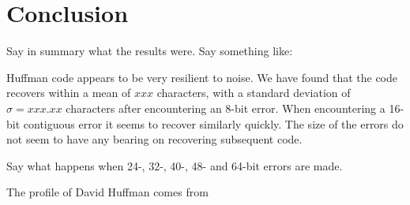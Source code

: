 \documentclass[a4wide,11pt]{article}
\begin{document}
\section{Conclusion}
\label{section:conclusion}
Say in summary what the results were. Say something like:  

Huffman code appears to be very resilient to noise.  We have found that the
code recovers within a mean of $xxx$ characters, with a standard deviation
of $\sigma = xxx.xx$ characters after encountering an 8-bit error. 
When encountering a 16-bit contiguous error it seems to recover similarly quickly.
The size of the errors do not seem to have any bearing on recovering subsequent code.

Say what happens when 24-, 32-, 40-, 48- and 64-bit errors are made.

\noindent The profile of David Huffman comes from~\cite{stix91}


\vfill
\pagebreak
\end{document}
